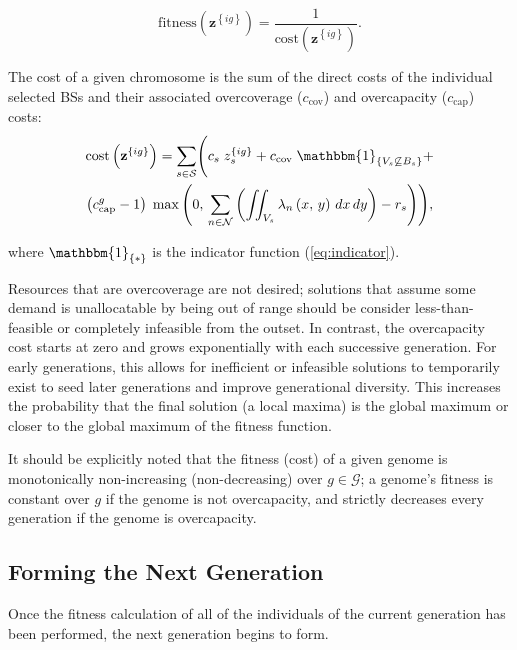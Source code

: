 \documentclass[12pt,dvipsnames]{report}
\newcommand{\ind}[1]{\mathbbm{1}_{\left\{ #1 \right\}}}
\begin{document}
\begin{equation} \label{eq:GAFit}
	\mathrm{fitness}\left( \textbf{z}^{\left\{ ig \right\}} \right) = \frac{1}{\mathrm{cost}\left( \textbf{z}^{\left\{ ig \right\}} \right)}.
\end{equation}

The cost of a given chromosome is the sum of the direct costs of the individual selected BSs and their associated overcoverage ($c_{\text{cov}}$) and overcapacity ($c_{\text{cap}}$) costs:
\begin{multline} \label{eq:GACost}
	\mathrm{cost}\left( \textbf{z}^{\left\{ ig \right\}} \right) = \sum_{s \in \mathcal{S}} \Biggl( c_s \; z_s^{\left\{ ig \right\}} + c_\text{cov} \; \ind{V_s \not\subseteq B_s} + \\ \left( c_\text{cap}^g - 1 \right) \; \max\left( 0,\, \sum_{n \in \mathcal{N}} \left( \iint_{V_s} \lambda_n\left( x,\, y \right)\, dx\, dy \right) - r_s \right) \Biggr),
\end{multline}

\noindent where $\ind{*}$ is the indicator function (\cref{eq:indicator}).

Resources that are overcoverage are not desired; solutions that assume some demand is unallocatable by being out of range should be consider less-than-feasible or completely infeasible from the outset.  In contrast, the overcapacity cost starts at zero and grows exponentially with each successive generation.  For early generations, this allows for inefficient or infeasible solutions to temporarily exist to seed later generations and improve generational diversity.  This increases the probability that the final solution (a local maxima) is the global maximum or closer to the global maximum of the fitness function.

It should be explicitly noted that the fitness (cost) of a given genome is monotonically non-increasing (non-decreasing) over $g \in \mathcal{G}$; a genome's fitness is constant over $g$ if the genome is not overcapacity, and strictly decreases every generation if the genome is overcapacity.

\subsection{Forming the Next Generation} \label{subsec:ga_next}

Once the fitness calculation of all of the individuals of the current generation has been performed, the next generation begins to form.
\end{document}
